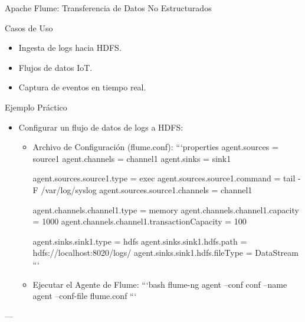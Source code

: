 \documentclass[presentation]{beamer}
\begin{document}
\begin{frame}[label={sec:org130638b}]{Apache Flume: Transferencia de Datos No Estructurados}
\begin{block}{Casos de Uso}
\begin{itemize}
\item Ingesta de logs hacia HDFS.
\item Flujos de datos IoT.
\item Captura de eventos en tiempo real.
\end{itemize}
\end{block}

\begin{block}{Ejemplo Práctico}
\begin{itemize}
\item \alert{\alert{Configurar un flujo de datos de logs a HDFS}}:
\begin{itemize}
\item \alert{\alert{Archivo de Configuración (flume.conf):}}
```properties
agent.sources = source1
agent.channels = channel1
agent.sinks = sink1

agent.sources.source1.type = exec
agent.sources.source1.command = tail -F /var/log/syslog
agent.sources.source1.channels = channel1

agent.channels.channel1.type = memory
agent.channels.channel1.capacity = 1000
agent.channels.channel1.transactionCapacity = 100

agent.sinks.sink1.type = hdfs
agent.sinks.sink1.hdfs.path = hdfs://localhost:8020/logs/
agent.sinks.sink1.hdfs.fileType = DataStream
```
\item \alert{\alert{Ejecutar el Agente de Flume}}:
```bash
flume-ng agent --conf conf --name agent --conf-file flume.conf
```
\end{itemize}
\end{itemize}

---
\end{block}
\end{frame}
\end{document}
